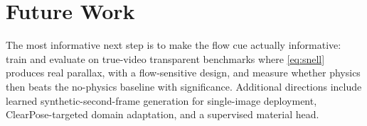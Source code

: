 \section{Future Work}
The most informative next step is to make the flow cue actually informative:
train and evaluate on true-video transparent benchmarks where \eqref{eq:snell}
produces real parallax, with a flow-sensitive \ofcv{} design, and measure
whether physics then beats the no-physics baseline with significance. Additional
directions include learned synthetic-second-frame generation for single-image
deployment, ClearPose-targeted domain adaptation, and a supervised material head.

